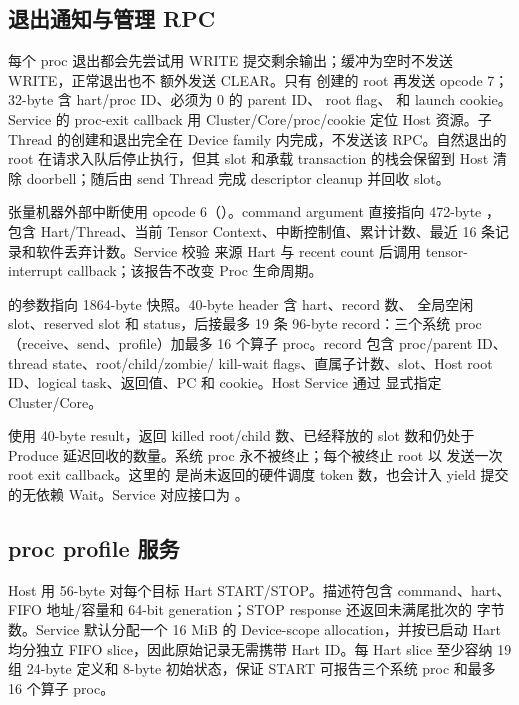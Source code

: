 \documentclass[../dayan_kernel_manual.tex]{subfiles}
\begin{document}
\subsection{退出通知与管理 RPC}

每个 proc 退出都会先尝试用 WRITE 提交剩余输出；缓冲为空时不发送 WRITE，正常退出也不
额外发送 CLEAR。只有
 创建的 root 再发送 opcode 7；32-byte
 含 hart/proc ID、必须为 0 的 parent ID、
root flag、 和 launch cookie。Service 的 proc-exit callback 用
Cluster/Core/proc/cookie 定位 Host 资源。子 Thread 的创建和退出完全在 Device family
内完成，不发送该 RPC。自然退出的 root 在请求入队后停止执行，但其 slot 和承载
transaction 的栈会保留到 Host 清除 doorbell；随后由 send Thread 完成 descriptor cleanup
并回收 slot。

张量机器外部中断使用 opcode 6（）。command argument
直接指向 472-byte ，包含 Hart/Thread、当前 Tensor
Context、中断控制值、累计计数、最近 16 条记录和软件丢弃计数。Service 校验
来源 Hart 与 recent count 后调用 tensor-interrupt callback；该报告不改变 Proc 生命周期。

 的参数指向 1864-byte 快照。40-byte header 含 hart、record 数、
全局空闲 slot、reserved slot 和 status，后接最多 19 条 96-byte record：三个系统
proc（receive、send、profile）加最多 16 个算子 proc。record 包含 proc/parent ID、thread state、root/child/zombie/
kill-wait flags、直属子计数、slot、Host root ID、logical task、返回值、PC 和 cookie。Host Service 通过
 显式指定 Cluster/Core。

 使用 40-byte result，返回 killed root/child 数、已经释放的
slot 数和仍处于 Produce 延迟回收的数量。系统 proc 永不被终止；每个被终止 root 以
 发送一次 root exit callback。这里的
 是尚未返回的硬件调度 token 数，也会计入 yield 提交的无依赖
Wait。Service 对应接口为 。

\subsection{proc profile 服务}

Host 用 56-byte  对每个目标 Hart START/STOP。描述符包含
command、hart、FIFO 地址/容量和 64-bit generation；STOP response 还返回未满尾批次的
字节数。Service 默认分配一个 16 MiB 的 Device-scope allocation，并按已启动 Hart
均分独立 FIFO slice，因此原始记录无需携带 Hart ID。每 Hart slice 至少容纳 19 组
24-byte 定义和 8-byte 初始状态，保证 START 可报告三个系统 proc 和最多 16 个算子 proc。
\end{document}
